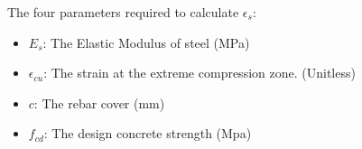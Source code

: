 The four parameters required to calculate $\epsilon_{s}$:
\begin{itemize}
\item $E_{s}$: The Elastic Modulus of steel (MPa)
\item $\epsilon_{cu}$: The strain at the extreme compression zone. (Unitless)
\item $c$: The rebar cover (mm) 
\item $f_{cd}$: The design concrete strength (Mpa)
\end{itemize}